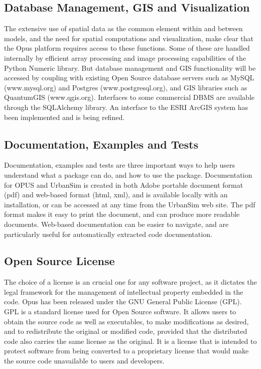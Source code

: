 \subsection{Database Management, GIS and Visualization}
The extensive use of spatial data as the common element within and between models, and the need for spatial computations and visualization, make clear that the Opus platform requires access to these functions.  Some of these are handled internally by efficient array processing and image processing capabilities of the Python Numeric library.  But database management and GIS functionality will be accessed by coupling with existing Open Source database servers such as MySQL (www.mysql.org) and Postgres (www.postgresql.org), and GIS libraries such as QuantumGIS (www.qgis.org).  Interfaces to some commercial DBMS are available through the SQLAlchemy library. An interface to the ESRI ArcGIS system has been implemented and is being refined.

\subsection{Documentation, Examples and Tests}
Documentation, examples and tests are three important ways to help users understand what a package can do, and how to use the package.  Documentation for OPUS and UrbanSim is created in both Adobe portable document format (pdf) and web-based format (html, xml), and is available locally with an installation, or can be accessed at any time from the UrbanSim web site.  The pdf format makes it easy to print the document, and can produce more readable documents.  Web-based documentation can be easier to navigate, and are particularly useful for automatically extracted code documentation.

\subsection{Open Source License}
The choice of a license is an crucial one for any software project, as it dictates the legal framework for the management of intellectual property embedded in the code.  Opus has been released under the GNU General Public License (GPL).  GPL is a standard license used for Open Source software.  It allows users to obtain the source code as well as executables, to make modifications as desired, and to redistribute the original or modified code, provided that the distributed code also carries the same license as the original.  It is a license that is intended to protect software from being converted to a proprietary license that would make the source code unavailable to users and developers.

